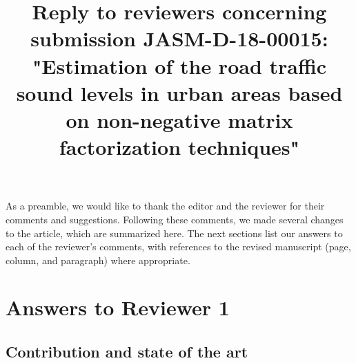 \documentclass[10pt]{article}
\title{Reply to reviewers concerning submission JASM-D-18-00015: "Estimation of the road traffic sound levels in urban areas based on non-negative matrix factorization techniques"}
\begin{document}
\maketitle

As a preamble, we would like to thank the editor and the reviewer for their comments and suggestions. Following these comments, we made several changes to the article, which are summarized here. The next sections list our answers to each of the reviewer’s comments, with references to the revised manuscript (page, column, and paragraph) where appropriate.

\section{Answers to Reviewer 1}

\subsection{Contribution and state of the art}
\end{document}
